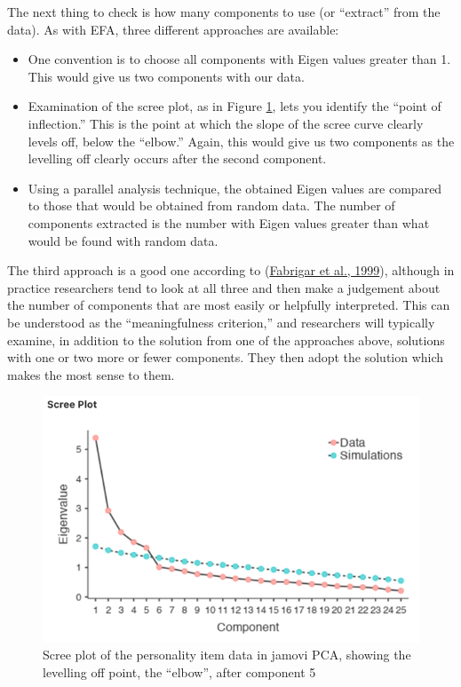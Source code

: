 \documentclass[
]{book}
\providecommand{\tightlist}{%
  \setlength{\itemsep}{0pt}\setlength{\parskip}{0pt}}
\begin{document}
The next thing to check is how many components to use (or ``extract'' from the data). As with EFA, three different approaches are available:

\begin{itemize}
\tightlist
\item
  One convention is to choose all components with Eigen values greater than 1. This would give us two components with our data.
\item
  Examination of the scree plot, as in Figure \ref{fig:pca3}, lets you identify the ``point of inflection.'' This is the point at which the slope of the scree curve clearly levels off, below the ``elbow.'' Again, this would give us two components as the levelling off clearly occurs after the second component.
\item
  Using a parallel analysis technique, the obtained Eigen values are compared to those that would be obtained from random data. The number of components extracted is the number with Eigen values greater than what would be found with random data.
\end{itemize}

The third approach is a good one according to (\protect\hyperlink{ref-Fabrigar1999}{Fabrigar et al., 1999}), although in practice researchers tend to look at all three and then make a judgement about the number of components that are most easily or helpfully interpreted. This can be understood as the ``meaningfulness criterion,'' and researchers will typically examine, in addition to the solution from one of the approaches above, solutions with one or two more or fewer components. They then adopt the solution which makes the most sense to them.

\begin{figure}

{\centering \includegraphics[width=1\linewidth]{img/factoranalysis/pca3} 

}

\caption{Scree plot of the personality item data in jamovi PCA, showing the levelling off point, the “elbow”, after component 5}\label{fig:pca3}
\end{figure}
\end{document}

